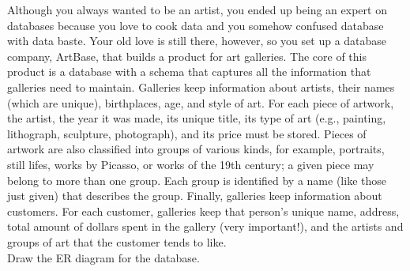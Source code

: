 \begin{problem}{2.8}

  Although you always wanted to be an artist, you ended up being an expert on databases because you love to cook data
  and you somehow confused database with data baste. Your old love is still there, however, so you set up a database
  company, ArtBase, that builds a product for art galleries. The core of this product is a database with a schema that
  captures all the information that galleries need to maintain. Galleries keep information about artists, their names
  (which are unique), birthplaces, age, and style of art. For each piece of artwork, the artist, the year it was made,
  its unique title, its type of art (e.g., painting, lithograph, sculpture, photograph), and its price must be stored.
  Pieces of artwork are also classified into groups of various kinds, for example, portraits, still lifes, works by
  Picasso, or works of the 19th century; a given piece may belong to more than one group. Each group is identified by a
  name (like those just given) that describes the group. Finally, galleries keep information about customers. For each
  customer, galleries keep that person's unique name, address, total amount of dollars spent in the gallery (very
  important!), and the artists and groups of art that the customer tends to like. \\

  \noindent Draw the ER diagram for the database.

  \begin{solution}

  \end{solution}
\end{problem}



